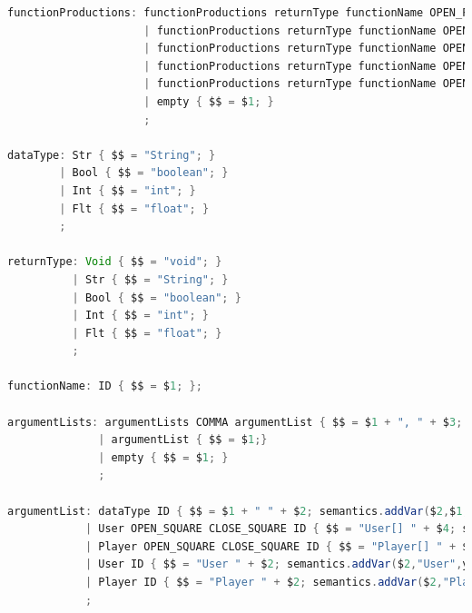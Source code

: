 \documentclass[12pt]{report}
\begin{document}
\begin{singlespace}
\begin{lstlisting}[language=Java,label=some-code,caption={flood$\_$grammar.y}]
functionProductions: functionProductions returnType functionName OPEN_PARAN argumentLists CLOSE_PARAN OPEN_CURLY  declarations statements returnProduction CLOSE_CURLY { $$ = $1 +"public static "+ $2 + " " + $3 + "(" + $5 + ")\n{\n" + $8 + $9 + $10 + "\n}\n"; this.scope = $3; semantics.addToFunctionTable($3, $2, $5, yyline); semantics.checkReturnTypeMatch($2, yyline); }
                     | functionProductions returnType functionName OPEN_PARAN argumentLists CLOSE_PARAN OPEN_CURLY empty CLOSE_CURLY {$$ = $1 +"public static "+ $2 + " " + $3 + "(" + $5 + ")\n{\n}\n"; this.scope = $3; semantics.addToFunctionTable($3, $2, $5, yyline); semantics.checkReturnTypeMatch($2, yyline); }
                     | functionProductions returnType functionName OPEN_PARAN argumentLists CLOSE_PARAN OPEN_CURLY  empty statements returnProduction CLOSE_CURLY {$$ = $1 +"public static "+ $2 + " " + $3 + "(" + $5 + ")\n{\n" + $8 + $9 + $10 + "\n}\n"; this.scope = $3; semantics.addToFunctionTable($3, $2, $5, yyline); semantics.checkReturnTypeMatch($2, yyline); }
                     | functionProductions returnType functionName OPEN_PARAN argumentLists CLOSE_PARAN OPEN_CURLY  declarations empty returnProduction CLOSE_CURLY {$$ = $1 +"public static "+ $2 + " " + $3 + "(" + $5 + ")\n{\n" + $8 + $9 + $10 + "\n}\n"; this.scope = $3; semantics.addToFunctionTable($3, $2, $5, yyline); semantics.checkReturnTypeMatch($2, yyline); }
                     | functionProductions returnType functionName OPEN_PARAN argumentLists CLOSE_PARAN OPEN_CURLY returnProd CLOSE_CURLY {$$ = $1 +"public static "+ $2 + " " + $3 + "(" + $5 + ")\n{\n" + $8 + "\n}\n"; this.scope = $3; semantics.addToFunctionTable($3, $2, $5, yyline); semantics.checkReturnTypeMatch($2, yyline); }
                     | empty { $$ = $1; }
                     ;

dataType: Str { $$ = "String"; }
        | Bool { $$ = "boolean"; }
        | Int { $$ = "int"; }
        | Flt { $$ = "float"; }
        ;

returnType: Void { $$ = "void"; }
          | Str { $$ = "String"; }
          | Bool { $$ = "boolean"; }
          | Int { $$ = "int"; }
          | Flt { $$ = "float"; }
          ;
          
functionName: ID { $$ = $1; };

argumentLists: argumentLists COMMA argumentList { $$ = $1 + ", " + $3; }
              | argumentList { $$ = $1;}
              | empty { $$ = $1; }
              ;

argumentList: dataType ID { $$ = $1 + " " + $2; semantics.addVar($2,$1,yyline); }
            | User OPEN_SQUARE CLOSE_SQUARE ID { $$ = "User[] " + $4; semantics.addVar($4,"User[]",yyline); }
            | Player OPEN_SQUARE CLOSE_SQUARE ID { $$ = "Player[] " + $4; semantics.addVar($4,"Player[]",yyline); }
            | User ID { $$ = "User " + $2; semantics.addVar($2,"User",yyline); }
            | Player ID { $$ = "Player " + $2; semantics.addVar($2,"Player",yyline); }
            ;


\end{lstlisting}
\end{singlespace}
\end{document}
